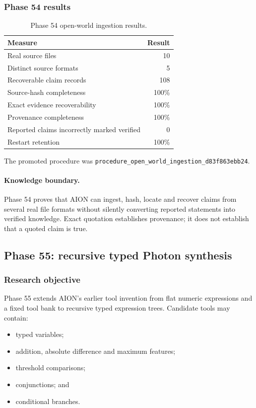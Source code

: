 \subsubsection{Phase 54 results}

\begin{table}[htbp]
\centering
\begin{tabular}{lr}
\hline
\textbf{Measure} & \textbf{Result}\\
\hline
Real source files & 10\\
Distinct source formats & 5\\
Recoverable claim records & 108\\
Source-hash completeness & 100\%\\
Exact evidence recoverability & 100\%\\
Provenance completeness & 100\%\\
Reported claims incorrectly marked verified & 0\\
Restart retention & 100\%\\
\hline
\end{tabular}
\caption{Phase 54 open-world ingestion results.}
\label{tab:phase54-results}
\end{table}

The promoted procedure was
\texttt{procedure\_open\_world\_ingestion\_d83f863ebb24}.

\paragraph{Knowledge boundary.}
Phase 54 proves that AION can ingest, hash, locate and recover claims from
several real file formats without silently converting reported statements
into verified knowledge.  Exact quotation establishes provenance; it does not
establish that a quoted claim is true.

\subsection{Phase 55: recursive typed Photon synthesis}
\label{subsec:phase55-recursive-photon}

\subsubsection{Research objective}

Phase 55 extends AION's earlier tool invention from flat numeric expressions
and a fixed tool bank to recursive typed expression trees.  Candidate tools
may contain:
\begin{itemize}
    \item typed variables;
    \item addition, absolute difference and maximum features;
    \item threshold comparisons;
    \item conjunctions; and
    \item conditional branches.
\end{itemize}

